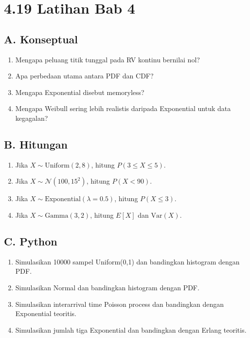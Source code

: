 \documentclass[
  letterpaper,
  DIV=11,
  numbers=noendperiod]{scrreprt}
\providecommand{\tightlist}{%
  \setlength{\itemsep}{0pt}\setlength{\parskip}{0pt}}
\begin{document}
\section{4.19 Latihan Bab 4}\label{latihan-bab-4}

\subsection{A. Konseptual}\label{a.-konseptual-3}

\begin{enumerate}
\def\labelenumi{\arabic{enumi}.}
\tightlist
\item
  Mengapa peluang titik tunggal pada RV kontinu bernilai nol?
\item
  Apa perbedaan utama antara PDF dan CDF?
\item
  Mengapa Exponential disebut memoryless?
\item
  Mengapa Weibull sering lebih realistis daripada Exponential untuk data
  kegagalan?
\end{enumerate}

\subsection{B. Hitungan}\label{b.-hitungan-2}

\begin{enumerate}
\def\labelenumi{\arabic{enumi}.}
\tightlist
\item
  Jika \(X \sim \mathrm{Uniform}(2,8)\), hitung \(P(3 \le X \le 5)\).
\item
  Jika \(X \sim \mathcal{N}(100,15^2)\), hitung \(P(X<90)\).
\item
  Jika \(X \sim \mathrm{Exponential}(\lambda=0.5)\), hitung
  \(P(X \le 3)\).
\item
  Jika \(X \sim \mathrm{Gamma}(3,2)\), hitung \(E[X]\) dan
  \(\mathrm{Var}(X)\).
\end{enumerate}

\subsection{C. Python}\label{c.-python-2}

\begin{enumerate}
\def\labelenumi{\arabic{enumi}.}
\tightlist
\item
  Simulasikan 10000 sampel Uniform(0,1) dan bandingkan histogram dengan
  PDF.
\item
  Simulasikan Normal dan bandingkan histogram dengan PDF.
\item
  Simulasikan interarrival time Poisson process dan bandingkan dengan
  Exponential teoritis.
\item
  Simulasikan jumlah tiga Exponential dan bandingkan dengan Erlang
  teoritis.
\end{enumerate}
\end{document}

